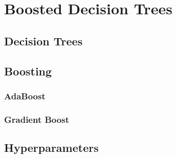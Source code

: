 \chapter{Boosted Decision Trees}\label{cha:boosted_decision_trees}

\section{Decision Trees}\label{sec:decision_trees}

\section{Boosting}\label{sec:boosting}

\subsection{AdaBoost}\label{sub:adaboost}

\subsection{Gradient Boost}\label{sub:gradient_boost}

\section{Hyperparameters}\label{sec:hyperparameters}
